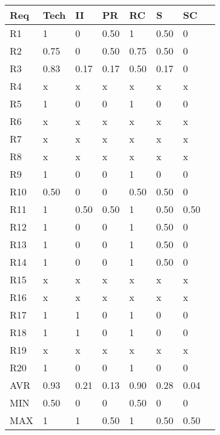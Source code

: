 \begin{tabularx}{\columnwidth}{|l|X|X|X|X|X|X|X|}
\hline
Req	& Tech & II   & PR   & RC   & S    & SC	   \\\hline
R1	& 1    & 0    & 0.50 & 1    & 0.50 & 0     \\\hline
R2	& 0.75 & 0    & 0.50 & 0.75 & 0.50 & 0     \\\hline
R3	& 0.83 & 0.17 & 0.17 & 0.50 & 0.17 & 0     \\\hline
R4	& x    & x    & x    & x    & x    & x     \\\hline
R5	& 1    & 0    & 0    & 1    & 0    & 0     \\\hline
R6	& x    & x    & x    & x    & x    & x     \\\hline
R7	& x    & x    & x    & x    & x    & x     \\\hline
R8	& x    & x    & x    & x    & x    & x     \\\hline
R9	& 1    & 0    & 0    & 1    & 0    & 0     \\\hline
R10	& 0.50 & 0    & 0    & 0.50 & 0.50 & 0     \\\hline
R11	& 1    & 0.50 & 0.50 & 1    & 0.50 & 0.50  \\\hline
R12	& 1    & 0    & 0    & 1    & 0.50 & 0     \\\hline
R13	& 1    & 0    & 0    & 1    & 0.50 & 0     \\\hline
R14	& 1    & 0    & 0    & 1    & 0.50 & 0     \\\hline
R15	& x    & x    & x    & x    & x    & x     \\\hline
R16	& x    & x    & x    & x    & x    & x     \\\hline
R17	& 1    & 1    & 0    & 1    & 0    & 0     \\\hline
R18	& 1    & 1    & 0    & 1    & 0    & 0     \\\hline
R19	& x    & x    & x    & x    & x    & x     \\\hline
R20	& 1    & 0    & 0    & 1    & 0    & 0     \\\hline
AVR	& 0.93 & 0.21 & 0.13 & 0.90 & 0.28 & 0.04  \\\hline
MIN	& 0.50 & 0    & 0    & 0.50 & 0    & 0     \\\hline
MAX	& 1    & 1    & 0.50 & 1    & 0.50 & 0.50  \\\hline
\end{tabularx}